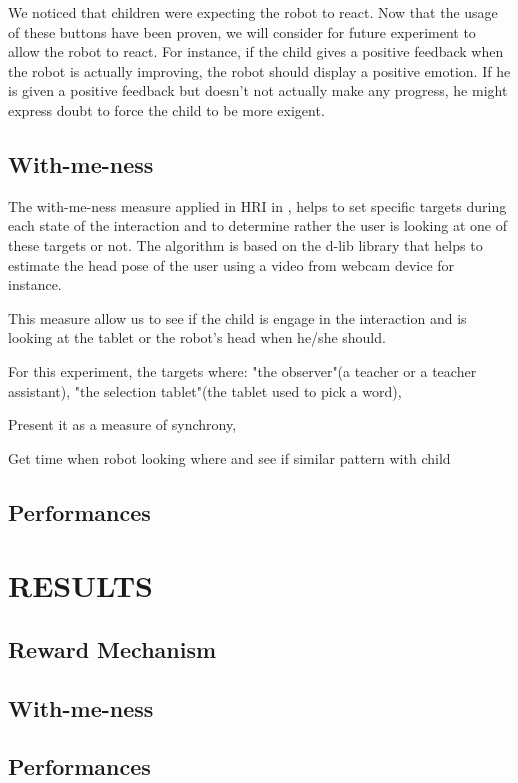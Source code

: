 \documentclass[letterpaper, 10 pt, conference]{ieeeconf}  %
\begin{document}
We noticed that children were expecting the robot to react. 
Now that the usage of these buttons have been proven, we will consider for future experiment to allow the robot to react. 
For instance, if the child gives a positive feedback when the robot is actually improving, the robot should display a positive emotion.
If he is given a positive feedback but doesn’t not actually make any progress, he might express doubt to force the child to be more exigent. 


\subsection{With-me-ness}
The with-me-ness measure applied in HRI in \cite{lemaignan2016realtime}, helps to set specific targets during each state of the interaction and to determine rather the user is looking at one of these targets or not. 
The algorithm is based on the d-lib library that helps to estimate the head pose of the user using a video from webcam device for instance.

This measure allow us to see if the child is engage in the interaction and is looking at the tablet or the robot's head when he/she should.

For this experiment, the targets where: "the observer"(a teacher or a teacher assistant), "the selection tablet"(the tablet used to pick a word), 

Present it as a measure of synchrony, 

Get time when robot looking where and see if similar pattern with child

\subsection{Performances}


\section{RESULTS}

\subsection{Reward Mechanism}
 


\subsection{With-me-ness}


\subsection{Performances}
\end{document}
